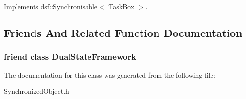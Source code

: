 Implements \hyperlink{classdsf_1_1_synchronisable_a225f9a5f6cb47d73e1ea4d788bbfcaaa}{dsf\+::\+Synchronisable$<$ Task\+Box $>$}.



\subsection{Friends And Related Function Documentation}
\hypertarget{classdsf_1_1_synchronized_object_a86db03c65431cb461cc8abf33bd2e74a}{}
\subsubsection[{Dual\+State\+Framework}]{\setlength{\rightskip}{0pt plus 5cm}friend class {\bf Dual\+State\+Framework}\hspace{0.3cm}{\ttfamily [friend]}}\label{classdsf_1_1_synchronized_object_a86db03c65431cb461cc8abf33bd2e74a}


The documentation for this class was generated from the following file\+:\begin{DoxyCompactItemize}
\item 
Synchronized\+Object.\+h\end{DoxyCompactItemize}
